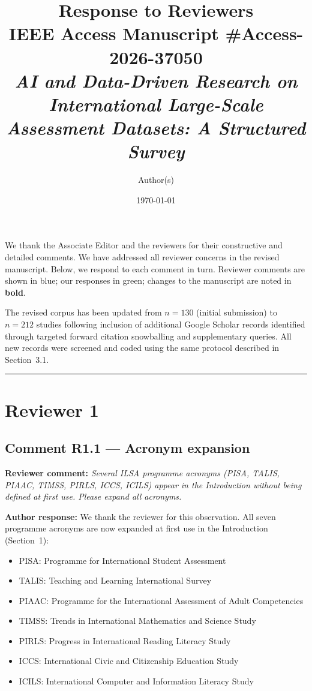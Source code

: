 \documentclass[12pt,a4paper]{article}
\title{Response to Reviewers\\
\large IEEE Access Manuscript \#Access-2026-37050\\
\normalsize \textit{AI and Data-Driven Research on International Large-Scale Assessment Datasets: A Structured Survey}}
\author{Author(s)}
\date{\today}
\newcommand{\reviewer}[1]{\textcolor{reviewercolor}{\textbf{Reviewer comment:} \textit{#1}}}
\newcommand{\response}[1]{\textcolor{authorcolor}{\textbf{Author response:} #1}}
\begin{document}
\maketitle

We thank the Associate Editor and the reviewers for their constructive and detailed comments. We have addressed all reviewer concerns in the revised manuscript. Below, we respond to each comment in turn. Reviewer comments are shown in \textcolor{reviewercolor}{blue}; our responses in \textcolor{authorcolor}{green}; changes to the manuscript are noted in \textbf{bold}.

The revised corpus has been updated from $n = 130$ (initial submission) to $n = 212$ studies following inclusion of additional Google Scholar records identified through targeted forward citation snowballing and supplementary queries. All new records were screened and coded using the same protocol described in Section~3.1.

\bigskip
\hrule
\bigskip

\section*{Reviewer 1}

\subsection*{Comment R1.1 — Acronym expansion}

\reviewer{Several ILSA programme acronyms (PISA, TALIS, PIAAC, TIMSS, PIRLS, ICCS, ICILS) appear in the Introduction without being defined at first use. Please expand all acronyms.}

\response{We thank the reviewer for this observation. All seven programme acronyms are now expanded at first use in the Introduction (Section~1):
\begin{itemize}[noitemsep]
  \item PISA: Programme for International Student Assessment
  \item TALIS: Teaching and Learning International Survey
  \item PIAAC: Programme for the International Assessment of Adult Competencies
  \item TIMSS: Trends in International Mathematics and Science Study
  \item PIRLS: Progress in International Reading Literacy Study
  \item ICCS: International Civic and Citizenship Education Study
  \item ICILS: International Computer and Information Literacy Study
\end{itemize}
}
\end{document}
